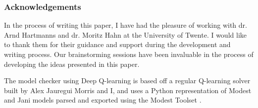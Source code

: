 \documentclass[runningheads]{llncs}
\begin{document}
\newpage
\subsubsection{Acknowledgements}

In the process of writing this paper, I have had the pleasure of working with dr. Arnd Hartmanns and dr. Moritz Hahn at the University of Twente. I would like to thank them for their guidance and support during the development and writing process. Our brainstorming sessions have been invaluable in the process of developing the ideas presented in this paper.

The model checker using Deep Q-learning is based off a regular Q-learning solver built by Alex Jauregui Morris and I, and uses a Python representation of Modest and Jani models parsed and exported using the Modest Toolset \cite{modest}.


%
%
%


\end{document}
